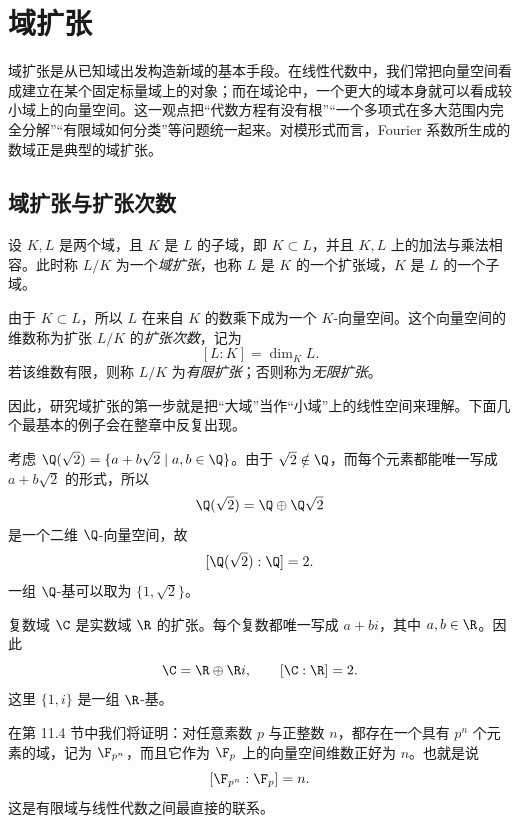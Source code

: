 \chapter{域扩张}

域扩张是从已知域出发构造新域的基本手段。在线性代数中，我们常把向量空间看成建立在某个固定标量域上的对象；而在域论中，一个更大的域本身就可以看成较小域上的向量空间。这一观点把“代数方程有没有根”“一个多项式在多大范围内完全分解”“有限域如何分类”等问题统一起来。对模形式而言，Fourier 系数所生成的数域正是典型的域扩张。

\section{域扩张与扩张次数}

\begin{definition}
设 $K,L$ 是两个域，且 $K$ 是 $L$ 的子域，即 $K\subset L$，并且 $K,L$ 上的加法与乘法相容。此时称 $L/K$ 为一个\emph{域扩张}，也称 $L$ 是 $K$ 的一个扩张域，$K$ 是 $L$ 的一个子域。

由于 $K\subset L$，所以 $L$ 在来自 $K$ 的数乘下成为一个 $K$-向量空间。这个向量空间的维数称为扩张 $L/K$ 的\emph{扩张次数}，记为
\[
[L:K]=\dim_K L.
\]
若该维数有限，则称 $L/K$ 为\emph{有限扩张}；否则称为\emph{无限扩张}。
\end{definition}

因此，研究域扩张的第一步就是把“大域”当作“小域”上的线性空间来理解。下面几个最基本的例子会在整章中反复出现。

\begin{example}
考虑 $\Q(\sqrt2)=\{a+b\sqrt2\mid a,b\in\Q\}$。由于 $\sqrt2\notin\Q$，而每个元素都能唯一写成 $a+b\sqrt2$ 的形式，所以
\[
\Q(\sqrt2)=\Q\oplus \Q\sqrt2
\]
是一个二维 $\Q$-向量空间，故
\[
[\Q(\sqrt2):\Q]=2.
\]
一组 $\Q$-基可以取为 $\{1,\sqrt2\}$。
\end{example}

\begin{example}
复数域 $\C$ 是实数域 $\R$ 的扩张。每个复数都唯一写成 $a+bi$，其中 $a,b\in\R$。因此
\[
\C=\R\oplus \R i,
\qquad [\C:\R]=2.
\]
这里 $\{1,i\}$ 是一组 $\R$-基。
\end{example}

\begin{example}
在第 11.4 节中我们将证明：对任意素数 $p$ 与正整数 $n$，都存在一个具有 $p^n$ 个元素的域，记为 $\F_{p^n}$，而且它作为 $\F_p$ 上的向量空间维数正好为 $n$。也就是说
\[
[\F_{p^n}:\F_p]=n.
\]
这是有限域与线性代数之间最直接的联系。
\end{example}

